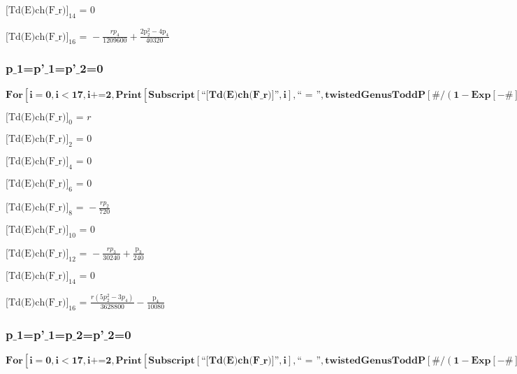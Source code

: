 \documentclass{article}
\newcommand{\unicode}[1]{{}}
\begin{document}
\noindent\(\text{[Td(E)ch(F$\_$r)]}_{14}\text{ = }0\)

\noindent\(\text{[Td(E)ch(F$\_$r)]}_{16}\text{ = }-\frac{r p_4}{1209600}+\frac{2 \text{p$\unicode{02bc}$}_2^2-4 \text{p$\unicode{02bc}$}_4}{40320}\)

\subsubsection*{p$\_$1=p{'}$\_$1=p{'}$\_$2=0}

\begin{doublespace}
\noindent\(\pmb{\text{For}\left[i=0,i<17,i\text{+=}2, \text{Print}\left[\text{Subscript}[\text{{``}[Td(E)ch(F$\_$r)]{''}},i],\text{{``} = {''}},\text{twistedGenusToddP}[\#/(1-\text{Exp}[-\#])\&,i]\text{/.}p_1\to
0\text{/.}\text{p$\unicode{02bc}$}_1\to 0\text{/.}\text{p$\unicode{02bc}$}_2\to 0\right]\right]}\)
\end{doublespace}

\noindent\(\text{[Td(E)ch(F$\_$r)]}_0\text{ = }r\)

\noindent\(\text{[Td(E)ch(F$\_$r)]}_2\text{ = }0\)

\noindent\(\text{[Td(E)ch(F$\_$r)]}_4\text{ = }0\)

\noindent\(\text{[Td(E)ch(F$\_$r)]}_6\text{ = }0\)

\noindent\(\text{[Td(E)ch(F$\_$r)]}_8\text{ = }-\frac{r p_2}{720}\)

\noindent\(\text{[Td(E)ch(F$\_$r)]}_{10}\text{ = }0\)

\noindent\(\text{[Td(E)ch(F$\_$r)]}_{12}\text{ = }-\frac{r p_3}{30240}+\frac{\text{p$\unicode{02bc}$}_3}{240}\)

\noindent\(\text{[Td(E)ch(F$\_$r)]}_{14}\text{ = }0\)

\noindent\(\text{[Td(E)ch(F$\_$r)]}_{16}\text{ = }\frac{r \left(5 p_2^2-3 p_4\right)}{3628800}-\frac{\text{p$\unicode{02bc}$}_4}{10080}\)

\subsubsection*{p$\_$1=p{'}$\_$1=p$\_$2=p{'}$\_$2=0}

\begin{doublespace}
\noindent\(\pmb{\text{For}\left[i=0,i<17,i\text{+=}2, \text{Print}\left[\text{Subscript}[\text{{``}[Td(E)ch(F$\_$r)]{''}},i],\text{{``} = {''}},\text{twistedGenusToddP}[\#/(1-\text{Exp}[-\#])\&,i]\text{/.}p_1\to
0\text{/.}\text{p$\unicode{02bc}$}_1\to 0\text{/.}p_2\to 0\text{/.}\text{p$\unicode{02bc}$}_2\to 0\right]\right]}\)
\end{doublespace}
\end{document}
